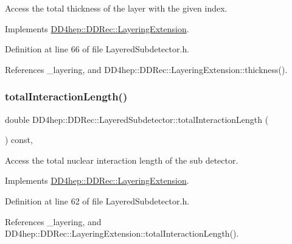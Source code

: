 Access the total thickness of the layer with the given index. 



Implements \hyperlink{class_d_d4hep_1_1_d_d_rec_1_1_layering_extension_a6510f43f195374e6adfb4312c27da450}{D\+D4hep\+::\+D\+D\+Rec\+::\+Layering\+Extension}.



Definition at line 66 of file Layered\+Subdetector.\+h.



References \+\_\+layering, and D\+D4hep\+::\+D\+D\+Rec\+::\+Layering\+Extension\+::thickness().

\hypertarget{class_d_d4hep_1_1_d_d_rec_1_1_layered_subdetector_a5b22049dfabd7fa556ba0c18e78daa3a}{}\label{class_d_d4hep_1_1_d_d_rec_1_1_layered_subdetector_a5b22049dfabd7fa556ba0c18e78daa3a} 
\subsubsection{\texorpdfstring{total\+Interaction\+Length()}{totalInteractionLength()}}
{\footnotesize\ttfamily double D\+D4hep\+::\+D\+D\+Rec\+::\+Layered\+Subdetector\+::total\+Interaction\+Length (\begin{DoxyParamCaption}{ }\end{DoxyParamCaption}) const\hspace{0.3cm}{\ttfamily [inline]}, {\ttfamily [virtual]}}



Access the total nuclear interaction length of the sub detector. 



Implements \hyperlink{class_d_d4hep_1_1_d_d_rec_1_1_layering_extension_aa5440bf9dc11305a785765ca155437fa}{D\+D4hep\+::\+D\+D\+Rec\+::\+Layering\+Extension}.



Definition at line 62 of file Layered\+Subdetector.\+h.



References \+\_\+layering, and D\+D4hep\+::\+D\+D\+Rec\+::\+Layering\+Extension\+::total\+Interaction\+Length().

\hypertarget{class_d_d4hep_1_1_d_d_rec_1_1_layered_subdetector_a2534d1e99f8d2f33aa28398fac9810b2}{}\label{class_d_d4hep_1_1_d_d_rec_1_1_layered_subdetector_a2534d1e99f8d2f33aa28398fac9810b2} 

